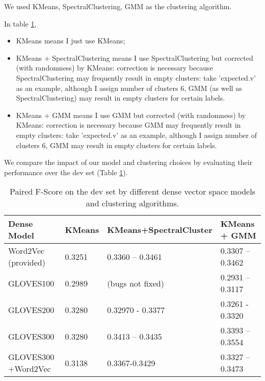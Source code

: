 \documentclass[12pt]{article}
\begin{document}
We used KMeans, SpectralClustering, GMM as the clustering algorithm. 

In table \ref{tab:denseresults},
\begin{itemize}
	\item  KMeans means I just use KMeans;
	\item KMeans + SpectralClustering means I use SpectralClustering but corrected (with randomness) by KMeans: correction is necessary because SpectralClustering may frequently result in empty clusters: take 'expected.v' as an example, although I assign number of clusters 6, GMM (as well as SpectralClustering) may result in empty clusters for certain labels.
	\item KMeans + GMM means I use GMM but corrected (with randomness) by KMeans: correction is necessary because GMM may frequently result in empty clusters: take 'expected.v' as an example, although I assign number of clusters 6, GMM  may result in empty clusters for certain labels.
\end{itemize}
We compare the impact of our model and clustering choices by evaluating their performance over the dev set (Table \ref{tab:denseresults}).

\begin{table}[]
\centering
\begin{tabular}{|l|l|l|l|} \hline
Dense Model  & KMeans & KMeans+SpectralCluster  & KMeans + GMM\\ \hline
Word2Vec (provided) &    0.3251    &   0.3360  -- 0.3461    &    0.3307 -- 0.3462            \\ \hline
GLOVES100       &   0.2989     &    (bugs not fixed)    & 0.2931 -- 0.3117 \\           \hline
GLOVES200       &   0.3280     &0.32970 - 0.3377        & 0.3261 - 0.3320           \\ \hline
GLOVES300       &   0.3280     &   0.3413 -- 0.3435   &  0.3393 -- 0.3554  \\ \hline
GLOVES300  +Word2Vec    & 0.3138 & 0.3367-0.3429     &   0.3327 -- 0.3473      \\ \hline
\end{tabular}
\caption{Paired F-Score on the dev set by different dense vector space models and clustering algorithms.}
\label{tab:denseresults}
\end{table}
\end{document}
